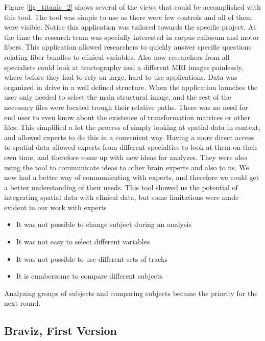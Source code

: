 Figure \ref{fig_titanic_2} shows several of the views that could be accomplished with this tool.
The tool was simple to use as there were few controls and all of them were visible. Notice this application was tailored towards the specific project. At the time the research team was specially interested in corpus callosum and motor fibers. This application allowed researchers to quickly answer specific questions relating fiber bundles to clinical variables. Also now researchers from all specialists could look at tractography and a different MRI images painlessly, where before they had to rely on large, hard to use applications. Data was organized in drive in a well defined structure. When the application launches the user only needed to select the main structural image, and the rest of the necessary files were located trough their relative paths. There was no need for end user to even know about the existence of transformation matrices or other files. This simplified a lot the process of simply looking at spatial data in context, and allowed experts to do this in a convenient way. Having a more direct access to spatial data allowed experts from different specialties to look at them on their own time, and therefore come up with new ideas for analyzes. They were also using the tool to communicate ideas to other brain experts and also to us. We now had a better way of communicating with experts, and therefore we could get a better understanding of their needs. This tool showed us the potential of integrating spatial data with clinical data, but some limitations were made evident in our work with experts
\begin{itemize}
\item It was not possible to change subject during an analysis
\item It was not easy to select different variables
\item It was not possible to use different sets of tracks
\item It is cumbersome to compare different subjects
\end{itemize}

Analyzing groups of subjects and comparing subjects became the priority for the next round.

\subsection{Braviz, First Version}


